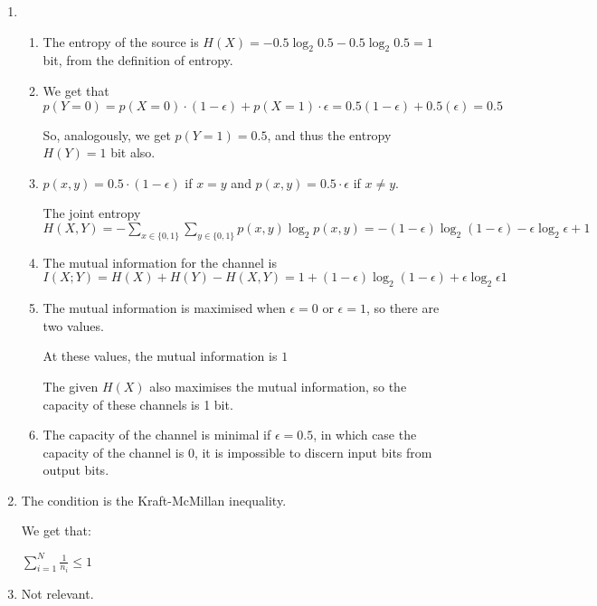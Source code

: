 


\begin{enumerate}[label=(\alph*)]

  \item
    \begin{enumerate}[label=(\roman*)]
      \item
        The entropy of the source is $H(X) = -0.5\log_2 0.5 - 0.5\log_2 0.5 = 1$ bit, from the definition of entropy.

      \item
        We get that $p(Y=0) = p(X=0) \cdot (1-\epsilon) + p(X=1) \cdot \epsilon = 0.5(1 - \epsilon) + 0.5(\epsilon) = 0.5$

        So, analogously, we get $p(Y=1) = 0.5$, and thus the entropy $H(Y) = 1$ bit also.

      \item
        $p(x,y) = 0.5 \cdot (1-\epsilon)$ if  $x=y$ and $p(x,y) = 0.5 \cdot \epsilon$ if $x \neq y$.

        The joint entropy $H(X,Y) = -\sum_{x \in \{0,1\}} \sum_{y \in \{0,1\}} p(x,y) \log_2 p(x,y) = -(1-\epsilon)\log_2 (1 - \epsilon) - \epsilon \log_2 \epsilon + 1$

      \item
        The mutual information for the channel is $I(X;Y) = H(X) + H(Y) - H(X,Y) = 1 + (1-\epsilon)\log_2 (1 - \epsilon) + \epsilon \log_2 \epsilon1$

      \item
        The mutual information is maximised when $\epsilon = 0$ or $\epsilon = 1$, so there are two values.

        At these values, the mutual information is $1$

        The given $H(X)$ also maximises the mutual information, so the capacity of these channels is 1 bit.

      \item
        The capacity of the channel is minimal if $\epsilon = 0.5$, in which case the capacity of the channel is 0, it is impossible to discern input bits from output bits.
        
    \end{enumerate}

  \item
    The condition is the Kraft-McMillan inequality.

    We get that:

    $\sum_{i=1}^N \frac{1}{n_i} \leq 1$

  \item
    Not relevant.
        
    \end{enumerate}

